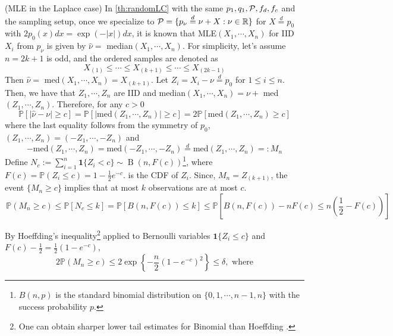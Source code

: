\begin{remark}(MLE in the Laplace case) \label{rem:RRLaplace}
    In \ref{th:randomLC} with the same  $p_1,q_1, \mathcal{P}, f_d,f_c$ and the sampling setup, once we specialize to $\mathcal{P}= \{p_{\nu} \overset{d}{=}\nu+X:\nu \in \mathbb{R}\}$ for  $X\overset{d}{=} p_0$ with $2p_0(x)dx = \exp(-|x|) dx$, it is known that  MLE$(X_1, \cdots, X_n)$ for IID $X_i$ from $p_{\nu}$ is given by $\hat{\nu}=$ median$(X_1, \cdots, X_n)$. For simplicity, let's   assume $n=2k+1$ is odd, and  the ordered samples are denoted as
    \begin{equation}
        X_{(1)} \leq  \cdots \leq X_{(k+1)} \leq \cdots  \leq X_{(2k-1)}
    \end{equation}
    Then $\hat{\nu}=$ med$(X_1, \cdots, X_n)= X_{(k+1)}$. Let $Z_i =X_i -\nu \overset{d}{=} p_0$ for $1\leq i\leq n$. Then, we have that $Z_1, \cdots, Z_n$ are IID and
    median$(X_1, \cdots, X_n)= \nu+$ med$(Z_1, \cdots, Z_n)$. Therefore, for any $c>0$ 
    \begin{equation}
        \mathbb{P}[|\hat{\nu}- \nu| \geq c ] = \mathbb{P}[|\text{med}(Z_1, \cdots, Z_n)| \geq c] = 2 \mathbb{P}[\text{med}(Z_1, \cdots, Z_n) \geq c]
    \end{equation}
    where the last equality follows from the symmetry of $p_0$, $(Z_1, \cdots, Z_n)= (-Z_1, \cdots, -Z_n)$ and
    \[
    -\text{med}(Z_1, \cdots, Z_n)= \text{med}(-Z_1, \cdots, -Z_n) \overset{d}{=} \text{med} (Z_1, \cdots, Z_n)=:M_n
    \]
   Define $N_c:=\sum_{i=1}^n \mathbf{1}\{Z_i< c\}\sim  \operatorname{B}(n,F(c))$\footnote{$B(n,p)$ is the standard binomial distribution on $\{0,1,  \cdots, n-1, n\}$ with the success probability $p$.}, where $F(c)= \mathbb P(Z_i\le c) = 1-\frac12 e^{-c}.$ is the CDF of $Z_i$. Since, $M_n=Z_{(k+1)}$, the event \(\{M_n\ge c\}\) implies that at most \(k\) observations are at most \(c\).  
   \[
   \,\mathbb P(M_n\ge c)
   \leq
   \mathbb{P}[N_c \leq k] 
   = \mathbb{P}[B(n, F(c))\leq k]
   \leq 
   \mathbb{P}\left[B(n, F(c)) - nF(c)\leq n \left( \frac{1}{2} - F(c)\right)\right]
   \]








By Hoeffding's inequality\footnote{One can obtain sharper lower tail estimates for Binomial than Hoeffding \citet{boucheron2013concentration}.} applied to Bernoulli  variables
\(\mathbf{1}\{Z_i\le c\}\) and $F(c)-\frac12
    =
    \frac12(1-e^{-c}),$
\[
    2 \mathbb P(M_n\ge c)
    \le
    2\exp\left\{
        -\frac n2(1-e^{-c})^2
    \right\} \leq \delta, \text{ where}
\]


\end{remark}
